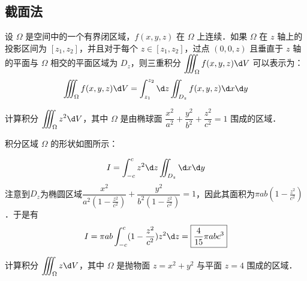 \documentclass[12pt, a4paper, oneside, UTF8]{ctexbook}
\begin{document}
\subsection{截面法}
\begin{theorem}
设 $\Omega$ 是空间中的一个有界闭区域，$f(x,y,z)$ 在 $\Omega$ 上连续．如果 $\Omega$ 在 $z$ 轴上的投影区间为 $[z_1, z_2]$，并且对于每个 $z \in [z_1, z_2]$，过点 $(0,0,z)$ 且垂直于 $z$ 轴的平面与 $\Omega$ 相交的平面区域为 $D_z$，则三重积分 $\displaystyle\iiint_\Omega f(x,y,z) \d V$ 可以表示为：
\[\iiint_\Omega f(x,y,z) \d V = \int_{z_1}^{z_2} \d z \iint_{D_z} f(x,y,z) \d x \d y\]
\end{theorem}
\begin{example}
    计算积分 $\displaystyle\iiint_\Omega z^2 \d V$，其中 $\Omega$ 是由椭球面 $\dfrac{x^2}{a^2}+\dfrac{y^2}{b^2}+\dfrac{z^2}{c^2}=1$ 围成的区域．
\end{example}
\begin{solution}
    积分区域 $\Omega$ 的形状如图所示：
    \begin{center}
    \end{center}
\[
        I = \int_{-c}^{c}z^2 \d z\iint_{D_z} \d x \d y
\]
注意到$D_z$为椭圆区域$\dfrac{x^2}{a^2(1-\frac{z^2}{c^2})}+\dfrac{y^2}{b^2(1-\frac{z^2}{c^2})}=1$，因此其面积为$\pi ab(1-\frac{z^2}{c^2})$．于是有
\[ I = \pi ab\int_{-c}^{c}(1-\frac{z^2}{c^2})z^2\d z = \boxed{\frac{4}{15}\pi abc^3}\]
\end{solution}
\begin{example}
    计算积分 $\displaystyle\iiint_\Omega z \d V$，其中 $\Omega$ 是抛物面 $z=x^2+y^2$ 与平面 $z=4$ 围成的区域．
\end{example}
\end{document}
